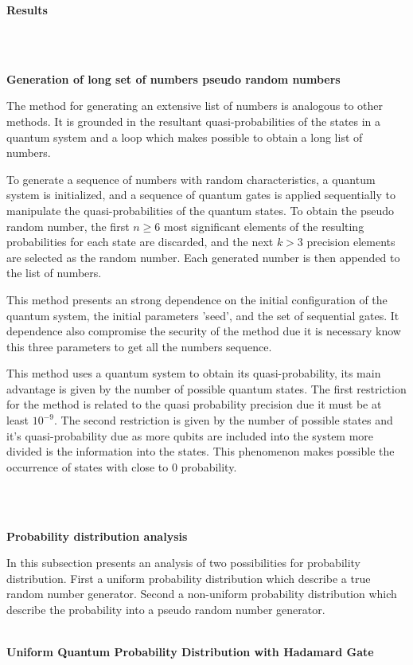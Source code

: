\documentclass[12pt]{article}
\begin{document}
	{\raggedright\large\textbf{Results}}\\\\
	{\raggedright\small\textbf{Generation of long set of numbers pseudo random numbers}}\par
	{The method for generating an extensive list of numbers is analogous to other methods. It is grounded in the resultant
		quasi-probabilities of the states in a quantum system and a loop which makes possible to obtain a long list of numbers.\par
		To generate a sequence of numbers with random characteristics, a quantum system is initialized, and a sequence of quantum
		gates is applied sequentially to manipulate the quasi-probabilities of the quantum states. To obtain the pseudo random number,
		the first $n \geq 6$ most significant elements of the resulting probabilities for each state are discarded, and the next $k > 3$ precision
		elements are selected as the random number. Each generated number is then appended to the list of numbers.\par
		This method presents an strong dependence on the initial configuration of the quantum system, the initial parameters ’seed’,
		and the set of sequential gates. It dependence also compromise the security of the method due it is necessary know this three
		parameters to get all the numbers sequence.\par
		This method uses a quantum system to obtain its quasi-probability, its main advantage is given by the number of possible
		quantum states. The first restriction for the method is related to the quasi probability precision due it must be at least $10^{-9}$. The second restriction is given by the number of possible states and it’s quasi-probability due as more qubits are included into the
		system more divided is the information into the states. This phenomenon makes possible the occurrence of states with close to
		0 probability.}\\\\
		{\raggedright\small\textbf{Probability distribution analysis}}\par
		{In this subsection presents an analysis of two possibilities for probability distribution. First a uniform probability distribution
			which describe a true random number generator. Second a non-uniform probability distribution which describe the probability
			into a pseudo random number generator.}\\\\
	   	{\raggedright\small\textbf{Uniform Quantum Probability Distribution with Hadamard Gate}}\par
\end{document}
